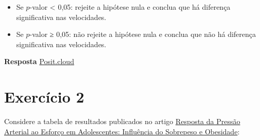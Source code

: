 \documentclass[
]{book}
\providecommand{\tightlist}{%
  \setlength{\itemsep}{0pt}\setlength{\parskip}{0pt}}
\begin{document}
\begin{enumerate}
  \begin{itemize}
  \tightlist
  \item
    Se \(p\)-valor \textless{} 0,05: rejeite a hipótese nula e conclua que há diferença significativa nas velocidades.
  \item
    Se \(p\)-valor ≥ 0,05: não rejeite a hipótese nula e conclua que não há diferença significativa nas velocidades.
  \end{itemize}
\end{enumerate}

\textbf{Resposta} \href{https://posit.cloud/content/10470490}{Posit.cloud}

\section{Exercício 2}\label{exercuxedcio-2}

Considere a tabela de resultados publicados no artigo \href{https://www.google.com/search?q=teste+t+medicina+artigo+&sca_esv=e5b91424496cf486&ei=2bREaLDDNsnX5OUPnpW78Ac&ved=0ahUKEwjwk8eEpuCNAxXJK7kGHZ7KDn4Q4dUDCBA&uact=5&oq=teste+t+medicina+artigo+&gs_lp=Egxnd3Mtd2l6LXNlcnAiGHRlc3RlIHQgbWVkaWNpbmEgYXJ0aWdvIDIHECEYoAEYCjIHECEYoAEYCjIFECEYnwVIlhdQrQlY4BVwAngBkAEAmAG6AaABrwmqAQMwLji4AQPIAQD4AQGYAgqgAt8JwgIKEAAYsAMY1gQYR8ICBRAhGKABwgIIEAAYCBgNGB7CAgUQABjvBcICCBAAGIAEGKIEmAMAiAYBkAYIkgcDMi44oAflIrIHAzAuOLgH1gnCBwUwLjcuM8gHHA&sclient=gws-wiz-serp\#:~:text=Resposta\%20da\%20Press\%C3\%A3o,br\%20\%E2\%80\%BA\%20abc}{Resposta da Pressão Arterial ao Esforço em Adolescentes: Influência do Sobrepeso e Obesidade}:
\end{document}
